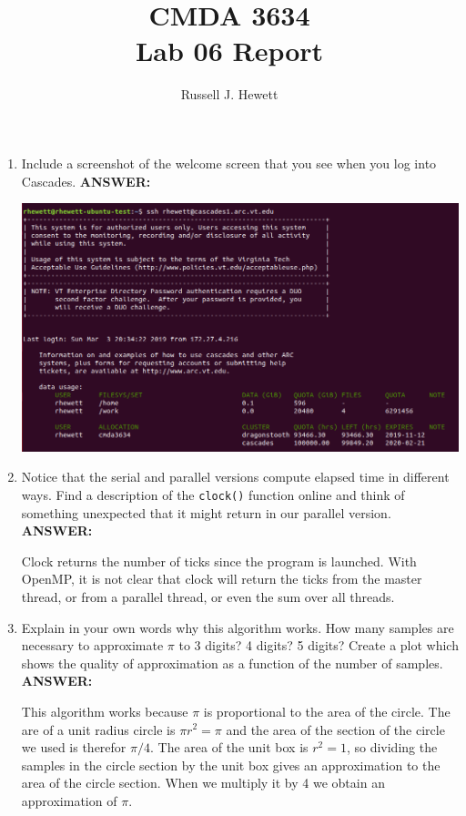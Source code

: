 \documentclass[letter]{article}
\title{CMDA 3634 \\ Lab 06 Report}
\author{Russell J. Hewett}
\date{}
\begin{document}
\maketitle

    \begin{enumerate}

        \item Include a screenshot of the welcome screen that you see when you log into Cascades. 
        \textbf{ANSWER:} %

        \includegraphics[scale=0.7]{login.png}

        \item Notice that the serial and parallel versions compute elapsed time in different ways.  Find a description of the \texttt{clock()} function online and think of something unexpected that it might return in our parallel version.
        \textbf{ANSWER:} %

        Clock returns the number of ticks since the program is launched.  With OpenMP, it is not clear that clock will return the ticks from the master thread, or from a parallel thread, or even the sum over all threads.

        \item Explain in your own words why this algorithm works.  How many samples are necessary to approximate $\pi$ to 3 digits? 4 digits? 5 digits?  Create a plot which shows the quality of approximation as a function of the number of samples.
        \textbf{ANSWER:} %

        This algorithm works because $\pi$ is proportional to the area of the circle.  The are of a unit radius circle is $\pi r^2 = \pi$ and the area of the section of the circle we used is therefor $\pi / 4.$  The area of the unit box is $r^2 = 1$, so dividing the samples in the circle section by the unit box gives an approximation to the area of the circle section.  When we multiply it by 4 we obtain an approximation of $\pi$.


\end{enumerate}
\end{document}
